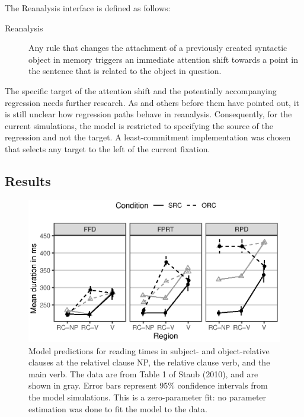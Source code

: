 \documentclass{cambridge7A}\usepackage[]{graphicx}\usepackage[]{color}
\makeatletter
\def\maxwidth{ %
  \ifdim\Gin@nat@width>\linewidth
    \linewidth
  \else
    \Gin@nat@width
  \fi
}
\newenvironment{knitrout}{}{} %
\makeatother
\begin{document}
The Reanalysis interface is defined as follows:
\begin{description}
  \item[Reanalysis] Any rule that changes the attachment of a previously created syntactic object in memory triggers an immediate attention shift towards a point in the sentence that is related to the object in question. 
\end{description}

The specific target of the attention shift and the potentially accompanying regression needs further research. As \cite{MalsburgVasishth2011,MalsburgEtAl2015} and others before them \citep{MeseguerCarreirasClifton2002,greenmitchellJML06} have pointed out, it is still unclear how regression paths behave in reanalysis.
Consequently, for the current simulations, the model is restricted to specifying the source of the regression and not the target. A least-commitment implementation was chosen that selects any target to the left of the current fixation.

\subsection{Results}

\begin{figure}[tb]
  \centering
\begin{knitrout}
\color{fgcolor}

{\centering \includegraphics[width=\maxwidth]{figures/fig-staub10modelRT-1} 

}



\end{knitrout}
\caption[Model predictions for reading times in subject- and object-relative clauses.]{Model predictions for reading times in subject- and object-relative clauses at the relativel clause NP, the relative clause verb, and the  main verb. The data are from Table 1 of Staub (2010), and are shown in gray. Error bars represent 95\% confidence intervals from the model simulations. This is a zero-parameter fit: no parameter estimation was done to fit the model to the data.} \label{fig:staubmodel:rt}
\end{figure}
\end{document}
